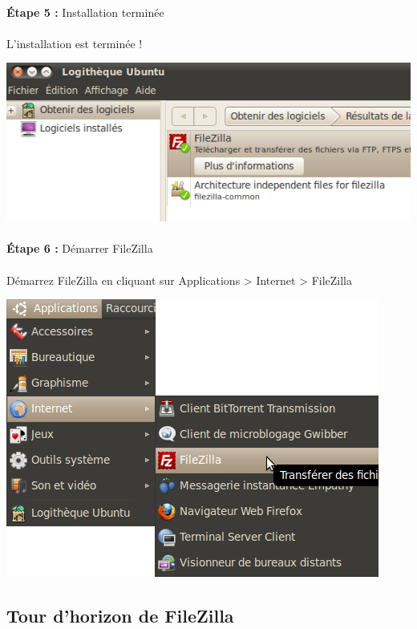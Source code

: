 \documentclass[10pt,a4paper]{article}
\begin{document}
\paragraph{}\textbf{Étape 5 : }Installation terminée
\paragraph{}L'installation est terminée !
\begin{center}
\includegraphics[scale=0.4]{img/0027.png}
\end{center}
\paragraph{}\textbf{Étape 6 : }Démarrer FileZilla
\paragraph{}Démarrez FileZilla en cliquant sur Applications > Internet > FileZilla
\begin{center}
\includegraphics[scale=0.4]{img/0028.png}
\end{center}

\subsection{Tour d'horizon de FileZilla}
\end{document}
